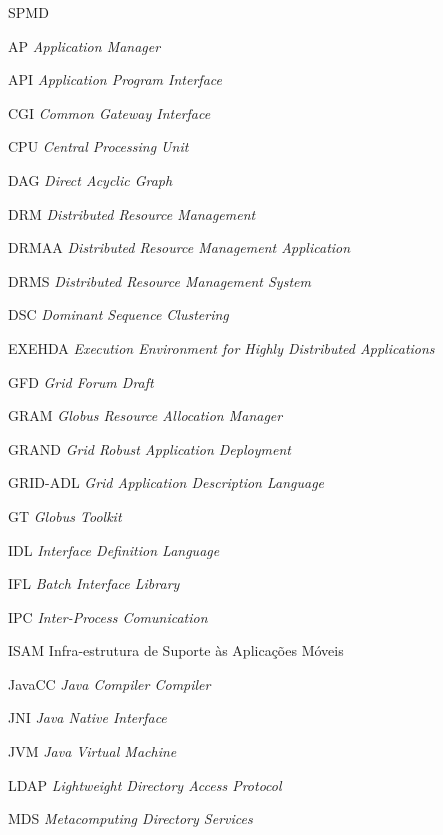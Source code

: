
\tableofcontents


\begin{listofabbrv}{SPMD}
        \item[AP]    \emph{Application Manager}
        \item[API]   \emph{Application Program Interface}
        \item[CGI]   \emph{Common Gateway Interface}
        \item[CPU]   \emph{Central Processing Unit}
        \item[DAG]	\emph{Direct Acyclic Graph}
        \item[DRM]   \emph{Distributed Resource Management}
        \item[DRMAA] \emph{Distributed Resource Management Application}
        \item[DRMS]  \emph{Distributed Resource Management System}
        \item[DSC]   \emph{Dominant Sequence Clustering}
        \item[EXEHDA]\emph{Execution Environment for Highly Distributed Applications}
        \item[GFD]   \emph{Grid Forum Draft}
        \item[GRAM]  \emph{Globus Resource Allocation Manager}
        \item[GRAND] \emph{Grid Robust Application Deployment}
        \item[GRID-ADL] \emph{Grid Application Description Language}
        \item[GT]    \emph{Globus Toolkit}
        \item[IDL]	\emph{Interface Definition Language}
        \item[IFL]   \emph{Batch Interface Library}
        \item[IPC]	\emph{Inter-Process Comunication}
        \item[ISAM]  Infra-estrutura de Suporte às Aplicações Móveis
        \item[JavaCC]\emph{Java Compiler Compiler}
        \item[JNI]	\emph{Java Native Interface}
        \item[JVM]	\emph{Java Virtual Machine}
        \item[LDAP]  \emph{Lightweight Directory Access Protocol}
        \item[MDS]   \emph{Metacomputing Directory Services}

\end{listofabbrv}
